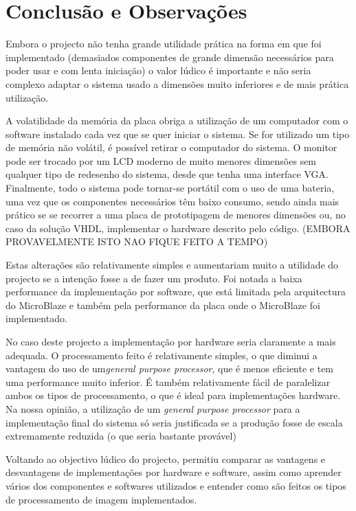 \documentclass[a4paper]{article}
\begin{document}
\section{Conclusão e Observações}
Embora o projecto não tenha grande utilidade prática na forma em que foi implementado (demasiados componentes de grande dimensão necessários para poder usar e com lenta iniciação) o valor lúdico é importante e não seria complexo adaptar o sistema usado a dimensões muito inferiores e de mais prática utilização. 

A volatilidade da memória da placa obriga a utilização de um computador com o software instalado cada vez que se quer iniciar o sistema. Se for utilizado um tipo de memória não volátil, é possível retirar o computador do sistema. O monitor pode ser trocado por um LCD moderno de muito menores dimensões sem qualquer tipo de redesenho do sistema, desde que tenha uma interface VGA. Finalmente, todo o sistema pode tornar-se portátil com o uso de uma bateria, uma vez que os componentes necessários têm baixo consumo, sendo ainda mais prático se se recorrer a uma placa de prototipagem de menores dimensões ou, no caso da solução VHDL, implementar o hardware descrito pelo código. (EMBORA PROVAVELMENTE ISTO NAO FIQUE FEITO A TEMPO)

Estas alterações são relativamente simples e aumentariam muito a utilidade do projecto se a intenção fosse a de fazer um produto. 
Foi notada a baixa performance da implementação por software, que está limitada pela arquitectura do MicroBlaze e também pela performance da placa onde o MicroBlaze foi implementado. 

No caso deste projecto a implementação por hardware seria claramente a mais adequada. O processamento feito é relativamente simples, o que diminui a vantagem do uso de um\textit{general purpose processor}, que é menos eficiente e tem uma performance muito inferior. É também relativamente fácil de paralelizar ambos os tipos de processamento, o que é ideal para implementações hardware. Na nossa opinião, a utilização de um \textit{general purpose processor} para a implementação final do sistema só seria justificada se a produção fosse de escala extremamente reduzida (o que seria bastante provável)

Voltando ao objectivo lúdico do projecto, permitiu comparar as vantagens e desvantagens de implementações por hardware e software, assim como aprender vários dos componentes e softwares utilizados e entender como são feitos os tipos de processamento de imagem implementados.






\nocite{}
\end{document}

